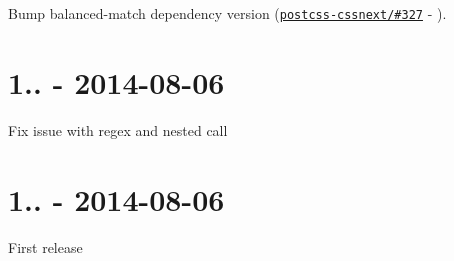
\begin{DoxyItemize}
\item Bump {\ttfamily balanced-\/match} dependency version (\href{https://github.com/MoOx/postcss-cssnext/issues/327}{\tt postcss-\/cssnext/\#327} -\/ ).
\end{DoxyItemize}

\section*{1.. -\/ 2014-\/08-\/06}


\begin{DoxyItemize}
\item Fix issue with regex and nested call
\end{DoxyItemize}

\section*{1.. -\/ 2014-\/08-\/06}

First release 